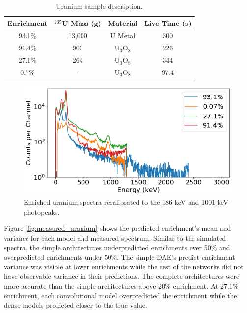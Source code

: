 \begin{table}[H]
\centering
\caption{Uranium sample description.}
\label{table:uranium_sample_description}
\begin{tabular}{cccc}
\hline
Enrichment & $^{235}$U Mass (g) & Material & Live Time (s)   \\ \hline
93.1\% & 13,000 & U Metal & 300 \\
91.4\% & 903 & U$_{3}$O$_{8}$ &  226\\
27.1\%  & 264 & U$_{3}$O$_{8}$ & 344 \\ 
0.7\% & - & U$_{3}$O$_{8}$ & 97.4 \\ \hline
\end{tabular}
\end{table}

\begin{figure}[H]
	\centering
	\includegraphics[width=0.8\linewidth]{images/measured_uranium_plots.png}
	\caption{Enriched uranium spectra recalibrated to the 186 keV and 1001 keV photopeaks.}
	\label{fig:measured_uranium_plots}
\end{figure}

Figure \ref{fig:measured_uranium} shows the predicted enrichment's mean and variance for each model and measured spectrum. Similar to the simulated spectra, the simple architectures underpredicted enrichments over 50\% and overpredicted enrichments under 50\%. The simple DAE's predict enrichment variance was visible at lower enrichments while the rest of the networks did not have observable variance in their predictions. The complete architectures were more accurate than the simple architectures above 20\% enrichment. At 27.1\% enrichment, each convolutional model overpredicted the enrichment while the dense models predicted closer to the true value. %



